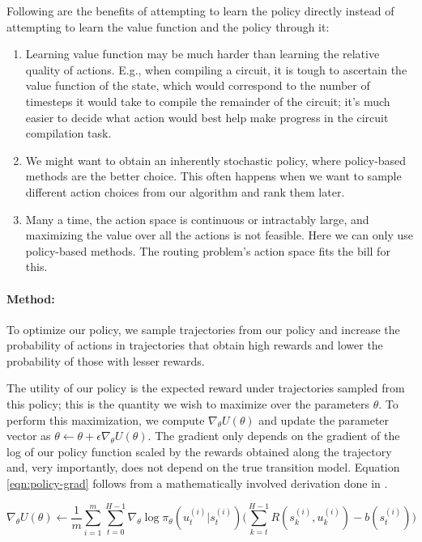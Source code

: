 Following are the benefits of attempting to learn the policy directly instead of attempting to learn the value function and the policy through it:
\begin{enumerate}
    \item Learning value function may be much harder than learning the relative quality of actions. E.g., when compiling a circuit, it is tough to ascertain the value function of the state, which would correspond to the number of timesteps it would take to compile the remainder of the circuit; it's much easier to decide what action would best help make progress in the circuit compilation task. 
    \item We might want to obtain an inherently stochastic policy, where policy-based methods are the better choice. This often happens when we want to sample different action choices from our algorithm and rank them later.
    \item Many a time, the action space is continuous or intractably large, and maximizing the value over all the actions is not feasible. Here we can only use policy-based methods. The routing problem's action space fits the bill for this.
\end{enumerate}

\paragraph{Method:}
To optimize our policy, we sample trajectories from our policy and increase the probability of actions in trajectories that obtain high rewards and lower the probability of those with lesser rewards.

The utility of our policy is the expected reward under trajectories sampled from this policy; this is the quantity we wish to maximize over the parameters $\theta$. To perform this maximization, we compute $\nabla_\theta U(\theta)$ and update the parameter vector as $\theta \leftarrow \theta + \epsilon \nabla_\theta U(\theta)$. The gradient only depends on the gradient of the log of our policy function scaled by the rewards obtained along the trajectory and, very importantly, does not depend on the true transition model. Equation \ref{eqn:policy-grad} follows from a mathematically involved derivation done in \cite{policy-grad-theorem}.

\begin{equation}\label{eqn:policy-grad}
    \nabla_\theta U(\theta) \leftarrow \frac{1}{m} \sum_{i=1}^{m} \sum_{t=0}^{H-1} \nabla_\theta \log \pi_\theta (u_t^{(i)}|s_t^{(i)}) \Bigg(\sum_{k=t}^{H-1} R(s_k^{(i)}, u_k^{(i)}) - b(s_t^{(i)})\Bigg)
\end{equation}

